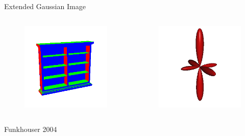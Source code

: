 \documentclass{beamer}
\begin{document}
\begin{frame}{Extended Gaussian Image}

\begin{columns}[c]

\begin{figure}[t]
    \includegraphics[width=\textwidth]{Bookcase.png}
\end{figure}

\begin{figure}[t]
    \includegraphics[width=\textwidth]{EGIBookcase.png}
\end{figure}

\end{columns}

\small Funkhouser 2004

\end{frame}
\end{document}
